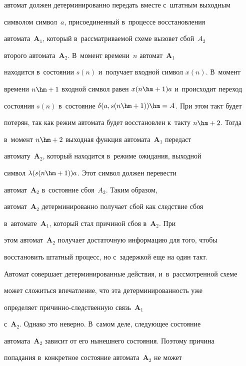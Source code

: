 автомат должен детерминированно передать вместе с~штат\-ным выходным 


символом символ~$a$, при\-со\-еди\-нен\-ный в~процессе вос\-ста\-нов\-ле\-ния 


автомата~\textbf{A}$_1$, который в~рас\-смат\-ри\-ва\-емой схеме вызовет сбой~$A_2$ 


второго автомата~\textbf{A}$_2$. В~момент времени~$n$ автомат~\textbf{A}$_1$ 


находится в~со\-сто\-янии $s(n)$ и~получает вход\-ной символ $x(n)$. В~момент 


времени $n\hm+1$ вход\-ной символ равен $x(n\hm+1)a$  и~происходит переход 


со\-сто\-яния $s(n)$ в~со\-сто\-яние $\delta (a, s(n\hm+1)) \hm= A$.  При этом такт будет 


потерян, так как режим автомата будет восстановлен к~так\-ту $n\hm+2$. Тогда 


в~момент  $n\hm+2$ выходная функция автомата~\textbf{A}$_1$ передаст 


автомату~\textbf{A}$_2$, который находится в~режиме ожидания, выходной 


символ  $\lambda (s(n\hm+1))a$. Этот сим\-вол должен перевести 


автомат~\textbf{A}$_2$ в~со\-сто\-яние сбоя~$A_2$. Таким образом, 


автомат~\textbf{A}$_2$ детерминированно получает сбой как следствие сбоя 


в~автомате~\textbf{A}$_1$, который стал причиной сбоя в~\textbf{A}$_2$. При 


этом автомат~\textbf{A}$_2$ получает достаточную информацию для того, чтобы 


вос\-ста\-но\-вить штатный процесс, но с~за\-держ\-кой еще на один такт.


  


  Автомат совершает детерминированные действия, и~в~рас\-смот\-рен\-ной схеме 


может сложиться впечатление, что эта де\-тер\-ми\-ни\-ро\-ван\-ность уже 


определяет при\-чин\-но-след\-ст\-вен\-ную связь~\textbf{A}$_1$ 


с~\textbf{A}$_2$. Однако это неверно. В~самом деле, сле\-ду\-ющее со\-сто\-яние 


автомата~\textbf{A}$_2$ зависит от его ны\-неш\-не\-го со\-сто\-яния. Поэтому причина 


попадания в~конкретное со\-сто\-яние автомата~\textbf{A}$_2$ не может 


